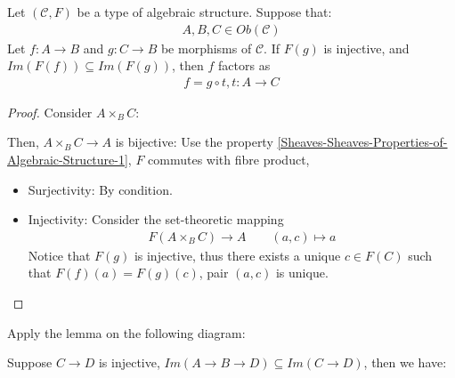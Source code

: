 \documentclass[Total.tex]{subfiles}
\begin{document}
					\begin{lemma}
						Let $(\mathcal{C},F)$ be a type of algebraic structure. Suppose that:
						\begin{gather*}
							A,B,C\in Ob(\mathcal{C})
						\end{gather*}
						Let $f:A\rightarrow B$ and $g:C\rightarrow B$ be morphisms of $\mathcal{C}$. If $F(g)$ is injective, and $Im(F(f))\subseteq Im(F(g))$, then $f$ factors as
						\begin{gather*}
							f=g\circ t,t:A\rightarrow C
						\end{gather*}
					\end{lemma}
					\begin{center}
					\end{center}
					\begin{proof}
						Consider $A\times_B C$:
						\begin{center}
						\end{center}
						Then, $A\times_B C\rightarrow A$ is bijective: Use the property \ref{Sheaves-Sheaves-Properties-of-Algebraic-Structure-1}, $F$ commutes with fibre product, 
						\begin{itemize}
							\item Surjectivity: By condition.
							\item Injectivity: Consider the set-theoretic mapping 
							\begin{gather*}
								F(A\times_B C)\rightarrow A\qquad (a,c)\mapsto a
							\end{gather*}
							Notice that $F(g)$ is injective, thus there exists a unique $c\in F(C)$ such that $F(f)(a)=F(g)(c)$, pair $(a,c)$ is unique. 
						\end{itemize}
					\end{proof}
					
					\begin{corollary}
						\label{Sheaves-Sheaves-Square-of-Algebraic-Structure}Apply the lemma on the following diagram:
						\begin{center}
						\end{center}
						Suppose $C\rightarrow D$ is injective, $Im(A\rightarrow B\rightarrow D)\subseteq Im(C\rightarrow D)$, then we have:
						\begin{center}
						\end{center}
					\end{corollary}
\end{document}
